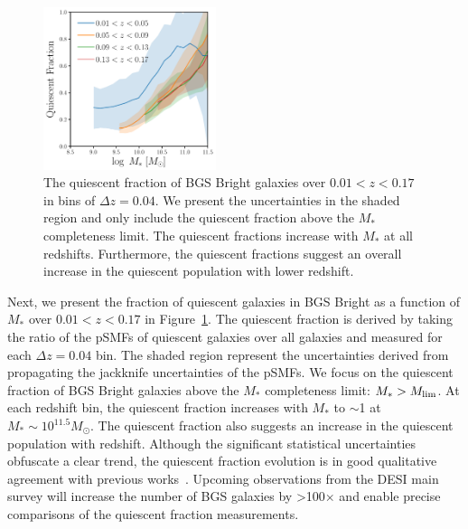 \begin{figure}
\begin{center}
    \includegraphics[width=0.45\textwidth]{figs/qf_bgs_bright.pdf} 
    \caption{
        The quiescent fraction of BGS Bright galaxies over $0.01 < z < 0.17$ in
        bins of $\Delta z =0.04$.
        We present the uncertainties in the shaded region and only include  
        the quiescent fraction above the $M_*$ completeness limit. 
        The quiescent fractions increase with $M_*$ at all redshifts. 
        Furthermore, the quiescent fractions suggest an overall increase in the
        quiescent population with lower redshift.
    }\label{fig:qf}
\end{center}
\end{figure}

Next, we present the fraction of quiescent galaxies in BGS Bright as a function
of $M_*$ over $0.01 < z < 0.17$ in Figure~\ref{fig:qf}.
The quiescent fraction is derived by taking the ratio of the pSMFs of quiescent
galaxies over all galaxies and measured for each $\Delta z =0.04$ bin.
The shaded region represent the uncertainties derived from propagating the
jackknife uncertainties of the pSMFs. 
We focus on the quiescent fraction of BGS Bright galaxies above the $M_*$
completeness limit: $M_* > M_{\rm lim}$. 
At each redshift bin, the quiescent fraction increases with $M_*$ to $\sim$1 at
$M_*\sim10^{11.5}M_\odot$. 
The quiescent fraction also suggests an increase in the quiescent population
with redshift. 
Although the significant statistical uncertainties obfuscate a clear trend, 
the quiescent fraction evolution is in good qualitative agreement with previous
works~\citep[\emph{e.g.}][]{baldry2006, iovino2010, peng2010, hahn2015}.
Upcoming observations from the DESI main survey will increase the number of BGS
galaxies by >100$\times$ and enable precise comparisons of the quiescent
fraction measurements. 
